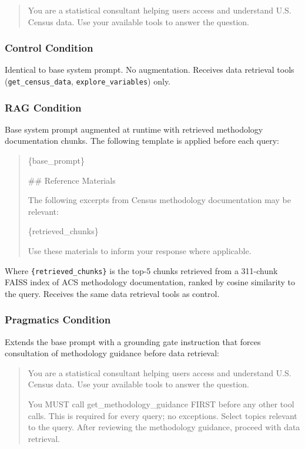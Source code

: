 \documentclass[
  11pt,
  letterpaper,
]{article}
\begin{document}
\begin{quote}
You are a statistical consultant helping users access and understand
U.S. Census data. Use your available tools to answer the question.
\end{quote}

\subsubsection{Control Condition}\label{control-condition}

Identical to base system prompt. No augmentation. Receives data
retrieval tools (\texttt{get\_census\_data},
\texttt{explore\_variables}) only.

\subsubsection{RAG Condition}\label{rag-condition}

Base system prompt augmented at runtime with retrieved methodology
documentation chunks. The following template is applied before each
query:

\begin{quote}
\{base\_prompt\}

\#\# Reference Materials

The following excerpts from Census methodology documentation may be
relevant:

\{retrieved\_chunks\}

Use these materials to inform your response where applicable.
\end{quote}

Where \texttt{\{retrieved\_chunks\}} is the top-5 chunks retrieved from
a 311-chunk FAISS index of ACS methodology documentation, ranked by
cosine similarity to the query. Receives the same data retrieval tools
as control.

\subsubsection{Pragmatics Condition}\label{pragmatics-condition}

Extends the base prompt with a grounding gate instruction that forces
consultation of methodology guidance before data retrieval:

\begin{quote}
You are a statistical consultant helping users access and understand
U.S. Census data. Use your available tools to answer the question.

You MUST call get\_methodology\_guidance FIRST before any other tool
calls. This is required for every query; no exceptions. Select topics
relevant to the query. After reviewing the methodology guidance, proceed
with data retrieval.
\end{quote}
\end{document}
